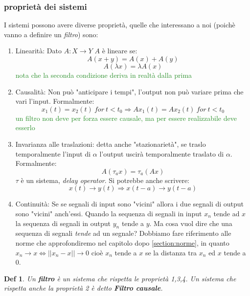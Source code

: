 \documentclass[a4paper]{article}
\newtheorem*{definition}{Def}
\newcommand{\appunto}[1]{\textcolor{ForestGreen}{#1}}
\begin{document}
\subsubsection{proprietà dei sistemi}
I sistemi possono avere diverse proprietà, quelle che interessano a noi (poichè vanno a definire un \textit{filtro}) sono:
\begin{enumerate}
	\item Linearità: Dato $A: X \rightarrow Y$ $A$ è lineare se:
		$$A(x + y) = A(x) + A(y)$$
		$$A(\lambda x) = \lambda A(x)$$
	\appunto{nota che la seconda condizione deriva in realtà dalla prima}
	\item Causalità: Non può "anticipare i tempi", l'output non può variare prima che vari l'input.
		Formalmente: 
		$$ x_1(t) = x_2(t)\: for \: t<t_0 \Rightarrow Ax_1(t) = Ax_2(t)\: for \: t<t_0 $$
		\appunto{un filtro non deve per forza essere causale, ma per essere realizzabile deve esserlo}
	\item Invarianza alle traslazioni: detta anche "stazionarietà", se traslo temporalmente l'input di $\alpha$ l'output uscirà temporalmente traslato di $\alpha$. 
		Formalmente:
		$$ A(\tau_a x) = \tau_a (Ax)$$
		$\tau$ è un sistema, \textit{delay operator}. Si potrebbe anche scrivere:
		$$ x(t) \rightarrow y(t) \Rightarrow x(t-a) \rightarrow y(t-a)$$
	\item Continuità: Se se segnali di input sono "vicini" allora i due segnali di output sono "vicini" anch'essi. 
		Quando la sequenza di segnali in input $x_n$ tende ad $x$ la sequenza di segnali in output $y_n$ tende a $y$.
		Ma cosa vuol dire che una sequenza di segnali \textit{tende} ad un segnale? 
		Dobbiamo fare riferimento alle norme che approfondiremo nel capitolo dopo \ref{section:norme}, in quanto $x_n \rightarrow x \iff ||x_n - x|| \rightarrow 0$ cioè $x_n$ tende a $x$ se la distanza tra $x_n$ ed $x$ tende a 0.
\end{enumerate}
\begin{definition}
	Un \textbf{filtro} è un sistema che rispetta le proprietà 1,3,4. Un sistema che rispetta anche la proprietà 2 è detto \textbf{Filtro causale}.
\end{definition}
\end{document}
